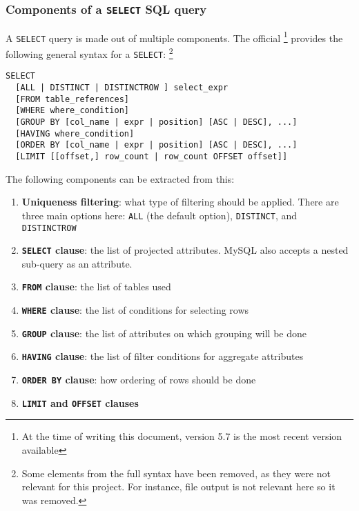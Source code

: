 \subsubsection{Components of a \texttt{SELECT} SQL query}

A \texttt{SELECT} query is made out of multiple components. The official  \cite{mysql:documentation} \footnote{At the time
of writing this document, version 5.7 is the most recent version available} provides the following general syntax for a \texttt{SELECT}:
\footnote{Some elements from the full syntax have been removed, as they
were not relevant for this project. For instance, file output is not relevant here so it
was removed.}

\begin{verbatim}
SELECT
  [ALL | DISTINCT | DISTINCTROW ] select_expr
  [FROM table_references]
  [WHERE where_condition]
  [GROUP BY [col_name | expr | position] [ASC | DESC], ...]
  [HAVING where_condition]
  [ORDER BY [col_name | expr | position] [ASC | DESC], ...]
  [LIMIT [[offset,] row_count | row_count OFFSET offset]]
\end{verbatim}

The following components can be extracted from this:

\begin{enumerate}
  \item \textbf{Uniqueness filtering}: what type of filtering should be applied. There are
  three main options here: \texttt{ALL} (the default option),
  \texttt{DISTINCT}, and \texttt{DISTINCTROW}
  \item \textbf{\texttt{SELECT} clause}: the list of projected attributes. MySQL
  also accepts a nested sub-query as an attribute.
  \item \textbf{\texttt{FROM} clause}: the list of tables used
  \item \textbf{\texttt{WHERE} clause}: the list of conditions for selecting rows
  \item \textbf{\texttt{GROUP} clause}: the list of attributes on which grouping will be
  done
  \item \textbf{\texttt{HAVING} clause}: the list of filter conditions for aggregate
  attributes
  \item \textbf{\texttt{ORDER BY} clause}: how ordering of rows should be done
  \item \textbf{\texttt{LIMIT} and \texttt{OFFSET} clauses}
\end{enumerate}

